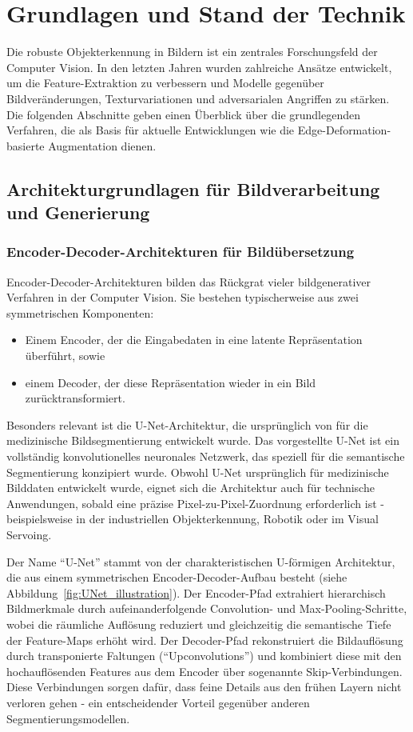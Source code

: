 \chapter{Grundlagen und Stand der Technik}
\label{ch:StandTechnik}
Die robuste Objekterkennung in Bildern ist ein zentrales Forschungsfeld der Computer Vision. In den letzten Jahren wurden zahlreiche Ansätze entwickelt, um die Feature-Extraktion zu verbessern und Modelle gegenüber Bildveränderungen, Texturvariationen und adversarialen Angriffen zu stärken. Die folgenden Abschnitte geben einen Überblick über die grundlegenden Verfahren, die als Basis für aktuelle Entwicklungen wie die Edge-Deformation-basierte Augmentation dienen.





\section{Architekturgrundlagen für Bildverarbeitung und Generierung}
\label{sec:Architekturgrundlagen}

\subsection{Encoder-Decoder-Architekturen für Bildübersetzung}
Encoder-Decoder-Architekturen bilden das Rückgrat vieler bildgenerativer Verfahren in der Computer Vision. Sie bestehen typischerweise aus zwei symmetrischen Komponenten: 
\begin{itemize}
    \item Einem Encoder, der die Eingabedaten in eine latente Repräsentation überführt, sowie
    \item einem Decoder, der diese Repräsentation wieder in ein Bild zurücktransformiert.
\end{itemize}
Besonders relevant ist die U-Net-Architektur, die ursprünglich von \textcite{ronneberger2015unet} für die medizinische Bildsegmentierung entwickelt wurde. Das vorgestellte U-Net ist ein vollständig konvolutionelles neuronales Netzwerk, das speziell für die semantische Segmentierung konzipiert wurde. Obwohl U-Net ursprünglich für medizinische Bilddaten entwickelt wurde, eignet sich die Architektur auch für technische Anwendungen, sobald eine präzise Pixel-zu-Pixel-Zuordnung erforderlich ist - beispielsweise in der industriellen Objekterkennung, Robotik oder im Visual Servoing.

Der Name \enquote{U-Net} stammt von der charakteristischen U-förmigen Architektur, die aus einem symmetrischen Encoder-Decoder-Aufbau besteht (siehe Abbildung~\ref{fig:UNet_illustration}). Der Encoder-Pfad extrahiert hierarchisch Bildmerkmale durch aufeinanderfolgende Convolution- und Max-Pooling-Schritte, wobei die räumliche Auflösung reduziert und gleichzeitig die semantische Tiefe der Feature-Maps erhöht wird. Der Decoder-Pfad rekonstruiert die Bildauflösung durch transponierte Faltungen (\enquote{Upconvolutions}) und kombiniert diese mit den hochauflösenden Features aus dem Encoder über sogenannte Skip-Verbindungen. Diese Verbindungen sorgen dafür, dass feine Details aus den frühen Layern nicht verloren gehen - ein entscheidender Vorteil gegenüber anderen Segmentierungsmodellen.

